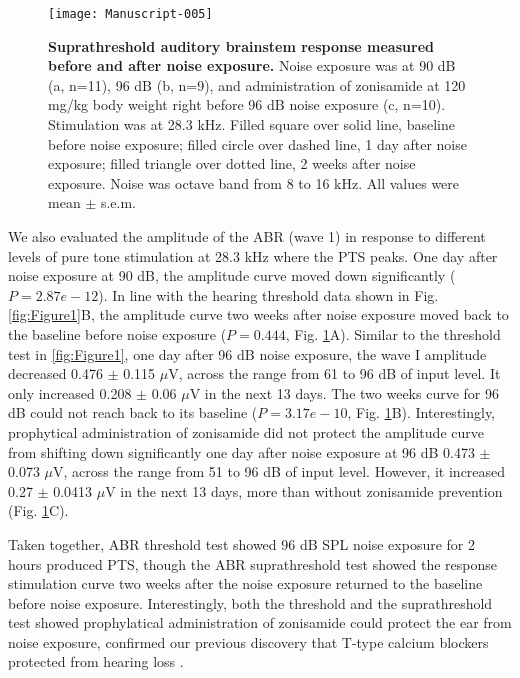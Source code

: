 \documentclass[11pt]{article}
\begin{document}
\begin{figure}[ht]
\centering
\texttt{[image: Manuscript-005]}

\caption{{\bf {Suprathreshold auditory brainstem response measured before and after noise exposure.}}  Noise exposure was at 90 dB (a, n=11), 96 dB (b, n=9), and administration of zonisamide at 120 mg/kg body weight right before 96 dB noise exposure (c, n=10). Stimulation was at 28.3 kHz.  Filled square over solid line, baseline before noise exposure; filled circle over dashed line, 1 day after noise exposure; filled triangle over dotted line, 2 weeks after noise exposure.  Noise was octave band from 8 to 16 kHz. All values were mean $\pm$ s.e.m.}
\label{fig:Figure2}
\end{figure}

We also evaluated the amplitude of the ABR (wave 1) in response to different levels of pure tone stimulation at 28.3 kHz where the PTS peaks. One day after noise exposure at 90 dB, the amplitude curve moved down significantly ($P=2.87e-12$). In line with the hearing threshold data shown in Fig. \ref{fig:Figure1}B, the amplitude curve two weeks after noise exposure moved back to the baseline before noise exposure 
($P=0.444$, Fig. \ref{fig:Figure2}A). Similar to the threshold test in \ref{fig:Figure1}, one day after 96 dB noise exposure, the wave I amplitude decreased 0.476 
$\pm$ 
0.115 $\mu$V, across the range from 61 to 96 dB of input level. It only increased 0.208 
$\pm$ 
0.06 $\mu$V in the next 13 days. The two weeks curve for 96 dB could not reach back to its baseline 
($P=3.17e-10$, Fig. \ref{fig:Figure2}B). Interestingly, prophytical administration of zonisamide did not protect the amplitude curve from shifting down significantly one day after noise exposure at 96 dB 0.473 
$\pm$ 
0.073 $\mu$V, across the range from 51 to 96 dB of input level. However, it increased 0.27 
$\pm$ 
0.0413 $\mu$V in the next 13 days, more than without zonisamide prevention (Fig. \ref{fig:Figure2}C).

Taken together, ABR threshold test showed 96 dB SPL noise exposure for 2 hours produced PTS, though the ABR suprathreshold test showed the response stimulation curve two weeks after the noise exposure returned to the baseline before noise exposure. Interestingly, both the threshold and the suprathreshold test showed prophylatical administration of zonisamide could protect the ear from noise exposure, confirmed our previous discovery that T-type calcium blockers protected from hearing loss \cite{Shen2007,Lei2011}.
\end{document}
